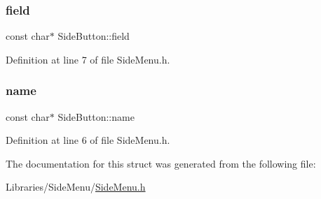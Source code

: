 \subsubsection{\texorpdfstring{field}{field}}
{\footnotesize\ttfamily const char$\ast$ Side\+Button\+::field}



Definition at line 7 of file Side\+Menu.\+h.

\mbox{\label{struct_side_button_a2533e6acfd5ba40cb7717412c25e6a0c}} 
\subsubsection{\texorpdfstring{name}{name}}
{\footnotesize\ttfamily const char$\ast$ Side\+Button\+::name}



Definition at line 6 of file Side\+Menu.\+h.



The documentation for this struct was generated from the following file\+:\begin{DoxyCompactItemize}
\item 
Libraries/\+Side\+Menu/\mbox{\hyperlink{_side_menu_8h}{Side\+Menu.\+h}}\end{DoxyCompactItemize}
